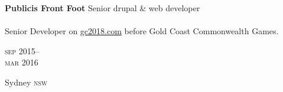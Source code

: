 \begin{minipage}[t]{\mainboxwidth\textwidth}
\textbf{Publicis Front Foot}\phantom{..} Senior drupal \& web developer \\
\\
Senior Developer on \href{https://www.gc2018.com/}{gc2018.com} 
before Gold Coast Commonwealth Games.
\\
{\small
\textit{}
\par}
\end{minipage}
\begin{minipage}[t]{\detailboxwidth\textwidth}
{
\hfill \textsc{sep} 2015--\\ 
\hspace*{0pt} \hfill \textsc{mar} 2016
\par
{\small\hfill Sydney \textsc{nsw}}
}
\end{minipage}
\\




